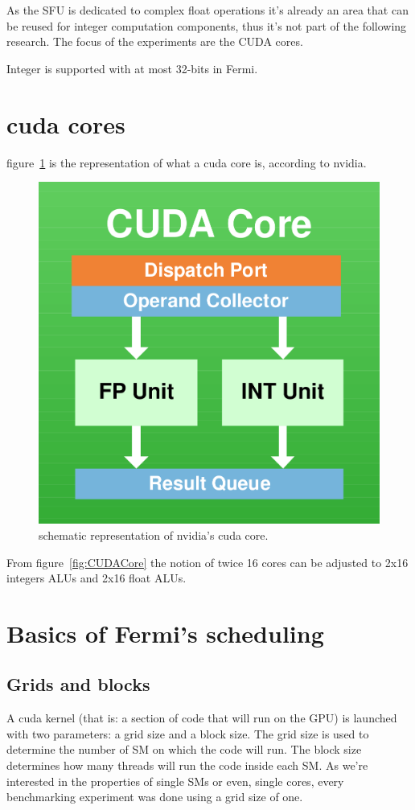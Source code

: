 \documentclass{report}
\begin{document}
    As the SFU is dedicated to complex float operations it's already an area
    that can be reused for integer computation components, thus it's not part
    of the following research. The focus of the experiments are the CUDA cores.
    
    Integer is supported with at most 32-bits in Fermi.

    \section{cuda cores}
    figure~\ref{fig:cudacore} is the representation of what a cuda core is,
    according to nvidia\cite{fermiwhitepap}.
    
    \begin{figure}[h]
    \centering
        \includegraphics[width=0.5\linewidth]{pictures/cudacore}
        \captionsetup{justification=centering}
        \caption{schematic representation of nvidia's cuda core.}
        \label{fig:cudacore}
    \end{figure}
    
    From figure~\ref{fig:CUDACore} the notion of twice 16 cores can be
    adjusted to 2x16 integers ALUs and 2x16 float ALUs.

    \section{Basics of Fermi's scheduling}
        \subsection{Grids and blocks} 
        A cuda kernel (that is: a section of code that will run on the GPU) is
        launched with two parameters: a grid size and a block size. The grid 
        size is used to determine the number of SM on which the code will run.
        The block size determines how many threads will run the code inside each
        SM\cite{cudaprog}. As we're interested in the properties of single SMs or even, single
        cores, every benchmarking experiment was done using a grid size of one.
\end{document}
